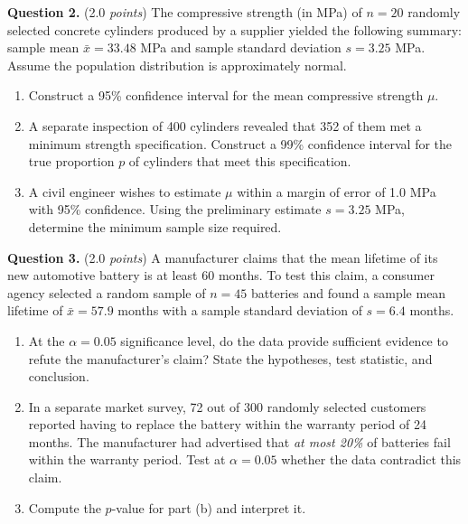 \documentclass[12pt]{article}
\begin{document}
\textbf{Question 2.} (2.0 \emph{points})
The compressive strength (in MPa) of $n = 20$ randomly selected concrete
cylinders produced by a supplier yielded the following summary:
sample mean $\bar{x} = 33.48$ MPa and sample standard deviation
$s = 3.25$ MPa. Assume the population distribution is approximately normal.
\begin{enumerate}[label=(\alph*),leftmargin=*]
  \item Construct a 95\% confidence interval for the mean compressive strength $\mu$.
  \item A separate inspection of 400 cylinders revealed that 352 of
        them met a minimum strength specification. Construct a 99\%
        confidence interval for the true proportion $p$ of cylinders
        that meet this specification.
  \item A civil engineer wishes to estimate $\mu$ within a margin of
        error of 1.0 MPa with 95\% confidence. Using the preliminary
        estimate $s = 3.25$ MPa, determine the minimum sample size
        required.
\end{enumerate}

\textbf{Question 3.} (2.0 \emph{points})
A manufacturer claims that the mean lifetime of its new automotive
battery is at least 60 months. To test this claim, a consumer agency
selected a random sample of $n = 45$ batteries and found a sample mean
lifetime of $\bar{x} = 57.9$ months with a sample standard deviation of
$s = 6.4$ months.
\begin{enumerate}[label=(\alph*),leftmargin=*]
  \item At the $\alpha = 0.05$ significance level, do the data provide
        sufficient evidence to refute the manufacturer's claim?
        State the hypotheses, test statistic, and conclusion.
  \item In a separate market survey, 72 out of 300 randomly selected
        customers reported having to replace the battery within the
        warranty period of 24 months. The manufacturer had advertised
        that \emph{at most 20\%} of batteries fail within the warranty
        period. Test at $\alpha = 0.05$ whether the data contradict
        this claim.
  \item Compute the $p$-value for part (b) and interpret it.
\end{enumerate}
\end{document}
